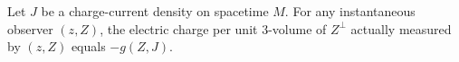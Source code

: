 Let $J$ be a charge-current density on spacetime $M$. For any instantaneous observer $(z, Z)$, the electric charge per unit 3-volume of $Z^\perp$ actually measured by $(z, Z)$ equals $-g(Z, J)$.

